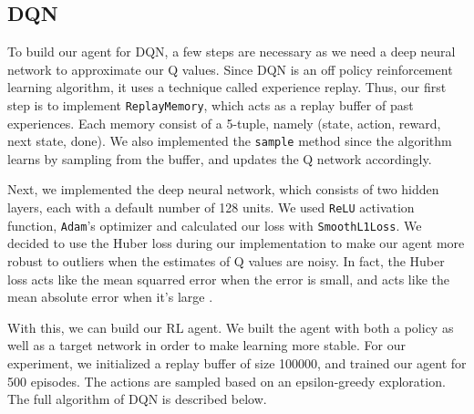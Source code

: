 \documentclass{article}
\begin{document}
\subsection{DQN}
To build our agent for DQN, a few steps are necessary as we need a deep neural
network to approximate our Q values. Since DQN is an off policy reinforcement
learning algorithm, it uses a technique called experience replay. Thus, our
first step is to implement \verb+ReplayMemory+, which acts as a replay buffer
of past experiences. Each memory consist of a 5-tuple, namely (state, action,
reward, next state, done). We also implemented the \verb+sample+ method since
the algorithm learns by sampling from the buffer, and updates the Q network
accordingly.

Next, we implemented the deep neural network, which consists of two hidden
layers, each with a default number of 128 units. We used \verb+ReLU+ activation
function, \verb+Adam+'s optimizer and calculated our loss with
\verb+SmoothL1Loss+. We decided to use the Huber loss during our implementation
to make our agent more robust to outliers when the estimates of Q values are
noisy. In fact, the Huber loss acts like the mean squarred error when the error
is small, and acts like the mean absolute error when it's large \cite{hubert}.

With this, we can build our RL agent. We built the agent with both a policy as
well as a target network in order to make learning more stable. For our
experiment, we initialized a replay buffer of size 100000, and trained our
agent for 500 episodes. The actions are sampled based on an epsilon-greedy
exploration. The full algorithm of DQN is described below.
\end{document}
